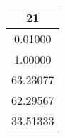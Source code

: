 \begin{tabular}{c}
\hline \hline
      21 \\
\hline \hline
 0.01000 \\
 1.00000 \\
63.23077 \\
62.29567 \\
33.51333 \\
\hline \hline
\end{tabular}

